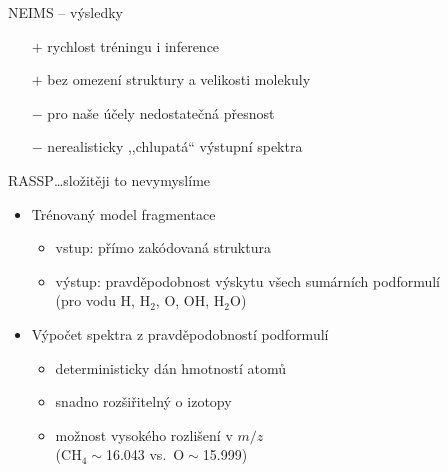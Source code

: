 \documentclass[aspectratio=169]{beamer}
\begin{document}
\begin{frame}
{NEIMS -- výsledky}
\begin{itemize} 
\item[$+$] rychlost tréningu i inference
\item[$+$] bez omezení struktury a velikosti molekuly
\item[$-$] pro naše účely nedostatečná přesnost
\item[$-$] nerealisticky ,,chlupatá`` výstupní spektra
\end{itemize}
\end{frame}

\begin{frame}
{RASSP}{\dots složitěji to nevymyslíme}

\begin{itemize}
\item Trénovaný model fragmentace
\begin{itemize}
\item vstup: přímo zakódovaná struktura 
\item výstup: pravděpodobnost výskytu všech sumárních podformulí  \\
(pro vodu H, H$_2$, O, OH, H$_2$O)
\end{itemize}
\item Výpočet spektra z pravděpodobností podformulí
\begin{itemize}
\item deterministicky dán hmotností atomů
\item snadno rozšiřitelný o izotopy
\item možnost vysokého rozlišení v $m/z$ \\
(CH$_4\sim{}$16.043 vs.\ O${}\sim{}$15.999)
\end{itemize}
\end{itemize}
\end{frame}
\end{document}
